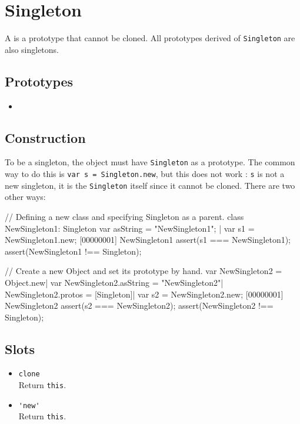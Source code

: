 \section{Singleton}

A  is a prototype that cannot be cloned. All prototypes
derived of \lstinline{Singleton} are also singletons.

\subsection{Prototypes}
\begin{itemize}
\item {}
\end{itemize}

\subsection{Construction}

To be a singleton, the object must have \lstinline{Singleton} as a
prototype. The common way to do this is
%
\lstinline{var s = Singleton.new},
%
but this does not work : \lstinline|s| is not a new singleton, it is
the \lstinline|Singleton| itself since it cannot be cloned. There are
two other ways:

\begin{urbiscript}[firstnumber=1]
// Defining a new class and specifying Singleton as a parent.
class NewSingleton1: Singleton
{
  var asString = "NewSingleton1";
}|
var s1 = NewSingleton1.new;
[00000001] NewSingleton1
assert(s1 === NewSingleton1);
assert(NewSingleton1 !== Singleton);

// Create a new Object and set its prototype by hand.
var NewSingleton2 = Object.new|
var NewSingleton2.asString = "NewSingleton2"|
NewSingleton2.protos = [Singleton]|
var s2 = NewSingleton2.new;
[00000001] NewSingleton2
assert(s2 === NewSingleton2);
assert(NewSingleton2 !== Singleton);
\end{urbiscript}

\subsection{Slots}
\begin{itemize}
\item \lstinline|clone|\\
  Return \lstinline|this|.

\item \lstinline|'new'|\\
  Return \lstinline|this|.
\end{itemize}

